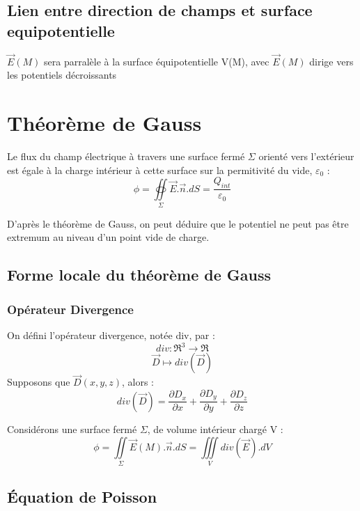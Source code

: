 \subsection{Lien entre direction de champs et surface equipotentielle}
\begin{prop}
$\overrightarrow{E}(M)$ sera parralèle à la surface équipotentielle V(M), avec $\overrightarrow{E}(M)$ dirige vers les potentiels décroissants
\end{prop}
\section{Théorème de Gauss}
\begin{enon}
Le flux du champ électrique à travers une surface fermé $\Sigma$ orienté vers l'extérieur est égale à la charge intérieur à cette surface sur la permitivité du vide, $\varepsilon_0$ : 
$$\phi = \underset{\Sigma}\oiint \overrightarrow{E}.\overrightarrow{n}.dS = \dfrac{Q_{int}}{\varepsilon_0}$$
\end{enon}
\begin{prop}
D'après le théorème de Gauss, on peut déduire que le potentiel ne peut pas être extremum au niveau d'un point vide de charge.
\end{prop}
\subsection{Forme locale du théorème de Gauss}
\subsubsection{Opérateur Divergence}
\begin{de}
On défini l'opérateur divergence, notée div, par : 
$$div : \Re^3 \rightarrow \Re$$
$$\overrightarrow{D} \mapsto div(\overrightarrow{D})$$
Supposons que $\overrightarrow{D}(x,y,z)$, alors :
$$div(\overrightarrow{D}) = \dfrac{\partial D_x}{\partial x} + \dfrac{\partial D_y}{\partial y} + \dfrac{\partial D_z}{\partial z}$$
\end{de}
\begin{prop}
Considérons une surface fermé $\Sigma$, de volume intérieur chargé V : 
$$\phi = \underset{\Sigma}\iint\overrightarrow{E}(M).\overrightarrow{n}.dS = \underset{V}\iiint div(\overrightarrow{E}).dV$$
\end{prop}
\subsection{Équation de Poisson}
